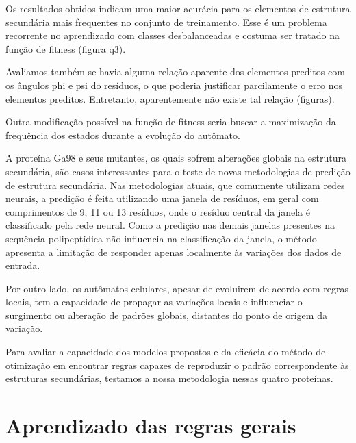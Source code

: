 Os resultados obtidos indicam uma maior acurácia para os elementos de estrutura secundária mais frequentes no conjunto de treinamento. Esse é um problema recorrente no aprendizado com classes desbalanceadas e costuma ser tratado na função de fitness (figura q3). 

Avaliamos também se havia alguma relação aparente dos elementos preditos com os ângulos phi e psi do resíduos, o que poderia justificar parcilamente o erro nos elementos preditos. Entretanto, aparentemente não existe tal relação (figuras).

Outra modificação possível na função de fitness seria buscar a maximização da frequência dos estados durante a evolução do autômato.  
























A proteína Ga98 e seus mutantes, os quais sofrem alterações globais na estrutura secundária, são casos interessantes para o teste de novas metodologias de predição de estrutura secundária. Nas metodologias atuais, que comumente utilizam redes neurais, a predição é feita utilizando uma janela de resíduos, em geral com comprimentos de 9, 11 ou 13 resíduos, onde o resíduo central da janela é classificado pela rede neural. Como a predição nas demais janelas presentes na sequência polipeptídica não influencia na classificação da janela, o método apresenta a limitação de responder apenas localmente às variações dos dados de entrada.  

Por outro lado, os autômatos celulares, apesar de evoluirem de acordo com regras locais, tem a capacidade de propagar as variações locais e influenciar o surgimento ou alteração de padrões globais, distantes do ponto de origem da variação. 

Para avaliar a capacidade dos modelos propostos e da eficácia do método de otimização em encontrar regras capazes de reproduzir o padrão correspondente às estruturas secundárias, testamos a nossa metodologia nessas quatro proteínas.



\chapter{Aprendizado das regras gerais}




